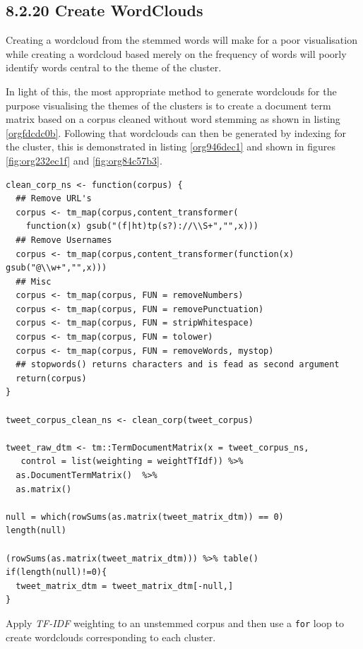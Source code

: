 \documentclass[11pt]{article}
\begin{document}
\subsection{8.2.20 Create WordClouds}
\label{sec:orgcb05ee2}
Creating a wordcloud from the stemmed words will make for a poor visualisation
while creating a wordcloud based merely on the frequency of words will poorly
identify words central to the theme of the cluster.

In light of this, the most appropriate method to generate wordclouds for the
purpose visualising the themes of the clusters is to create a document term
matrix based on a corpus cleaned without word stemming as shown in listing \ref{orgfdcdc0b}.
Following that wordclouds can then be generated by indexing for the cluster,
this is demonstrated in listing \ref{org946dec1} and shown in figures \ref{fig:org232ec1f} and \ref{fig:org84c57b3}.


\begin{listing}[htbp]
\begin{verbatim}
clean_corp_ns <- function(corpus) {
  ## Remove URL's
  corpus <- tm_map(corpus,content_transformer(
    function(x) gsub("(f|ht)tp(s?)://\\S+","",x)))
  ## Remove Usernames
  corpus <- tm_map(corpus,content_transformer(function(x) gsub("@\\w+","",x)))
  ## Misc
  corpus <- tm_map(corpus, FUN = removeNumbers)
  corpus <- tm_map(corpus, FUN = removePunctuation)
  corpus <- tm_map(corpus, FUN = stripWhitespace)
  corpus <- tm_map(corpus, FUN = tolower)
  corpus <- tm_map(corpus, FUN = removeWords, mystop)
  ## stopwords() returns characters and is fead as second argument
  return(corpus)
}

tweet_corpus_clean_ns <- clean_corp(tweet_corpus)

tweet_raw_dtm <- tm::TermDocumentMatrix(x = tweet_corpus_ns,
   control = list(weighting = weightTfIdf)) %>%
  as.DocumentTermMatrix()  %>%
  as.matrix()

null = which(rowSums(as.matrix(tweet_matrix_dtm)) == 0)
length(null)

(rowSums(as.matrix(tweet_matrix_dtm))) %>% table()
if(length(null)!=0){
  tweet_matrix_dtm = tweet_matrix_dtm[-null,]
}

\end{verbatim}
\caption{\label{orgfdcdc0b}Apply \emph{TF-IDF} weighting to an unstemmed corpus and then use a \texttt{for} loop to create wordclouds corresponding to each cluster.}
\end{listing}
\end{document}
